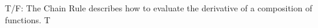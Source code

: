 {T/F: The Chain Rule describes how to evaluate the derivative of a composition of functions.
}
{T
}
